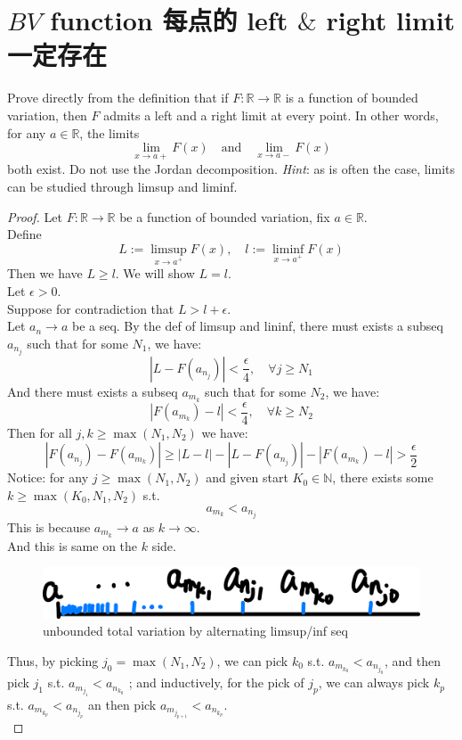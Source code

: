 \documentclass[lang=cn,11pt]{elegantbook}
\begin{document}
\section{$BV$ function 每点的 left $\&$ right limit 一定存在}
  Prove directly from the definition that if $F\colon\mathbb{R}\to\mathbb{R}$ is a function of bounded variation, then $F$ admits a left and a right limit at every point. In other words, for any $a\in \mathbb{R}$, the limits \[
    \lim_{x\to a+}F(x) 
    \quad\text{and}\quad
    \lim_{x\to a-}F(x) 
  \]
  both exist. Do not use the Jordan decomposition. \textit{Hint}: as is often the case, limits can be studied through limsup and liminf.
\begin{proof}
    Let $F\colon\mathbb{R}\to\mathbb{R}$ be a function of bounded variation, fix $a\in \mathbb{R}$.\\
    Define $$
L:=\limsup _{x \rightarrow a^{+}} F(x), \quad l:=\liminf _{x \rightarrow a^{+}} F(x) 
$$
Then we have $L \geq l$. We will show $L = l$.\\
Let $\epsilon  >0$.\\
Suppose for contradiction that $L > l +\epsilon$.\\
Let $a_n\to a$ be a seq. By the def of limsup and lininf, there must exists a subseq $a_{n_j}$ such that for some $N_1$, we have: \[
|L - F(a_{n_j}) | < \frac{\epsilon}{4},\quad \forall j \geq N_1
\] And there must exists a subseq $a_{m_k}$ such that for some $N_2$, we have: \[
|F(a_{m_k}) - l| < \frac{\epsilon}{4},\quad \forall k \geq  N_2
\]
Then for all $j,k \geq \max (N_1, N_2)$ we have: \[
|F(a_{n_j}) - F(a_{m_k}) | \geq  |L-l| - |L - F(a_{n_j}) |  -  |F(a_{m_k}) - l| >     \frac{\epsilon}{2}
\]
Notice: for any $j \geq \max (N_1, N_2) $ and given start $K_0\in\mathbb{N}$, there exists some $k \geq \max (K_0,N_1, N_2) $ s.t.   \[ a_{m_k} < a_{n_j}
\] This is because $a_{m_k}\to a$ as $k\to \infty$. \\
And this is same on the $k$ side.\\
\begin{figure}
    \centering
    \includegraphics[width=0.5\linewidth]{homework/hw11.assets/image-20250420224142076.png}
    \caption{unbounded total variation by alternating limsup/inf seq}
    \label{fig:unbounded total variation by alternating limsup/inf seq}
\end{figure}
Thus, by picking $j_0 = \max (N_1,N_2)$, we can pick $k_0$ s.t. $ a_{m_{k_0}} < a_{n_{j_0}}$, and then pick $j_1$ s.t. $ a_{m_{j_1}} < a_{n_{k_0}}$ ; and inductively, for the pick of $j_p$, we can always pick $k_p$ s.t. $ a_{m_{k_p}} < a_{n_{j_p}}$ an then pick $ a_{m_{j_{p+1}}} < a_{n_{k_p}}$.\\

\end{proof}
\end{document}
